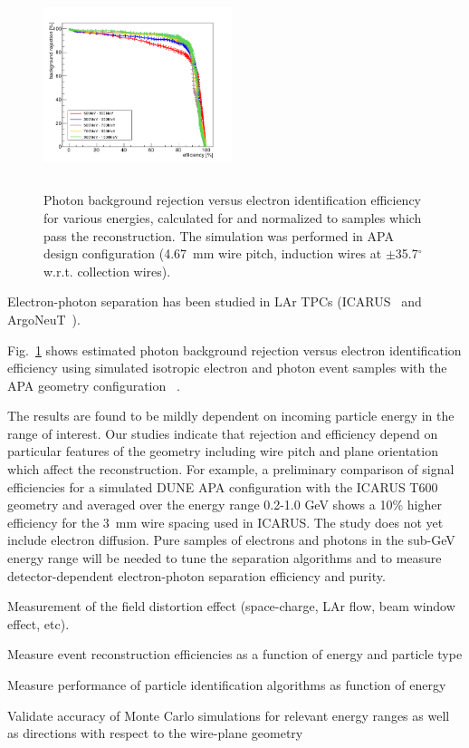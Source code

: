 \begin{description}
\begin{figure}[h!]
  \centering
\includegraphics[width=0.49\textwidth,height=6.0cm]{figures/eff-bgdrej-diffen}
  \caption{
 Photon background rejection versus electron identification efficiency for various energies, calculated for and normalized to samples which pass the reconstruction. 
The simulation was performed in APA design configuration (4.67~mm wire pitch, induction wires at $\pm$35.7$^{\circ}$ w.r.t. collection wires). 
}

\label{fig:egam}
\end{figure}
Electron-photon separation has been studied in LAr TPCs
(ICARUS~\cite{icarus_eg} and ArgoNeuT~\cite{argoneut_eg}).

Fig.~\ref{fig:egam} 
 shows estimated photon background rejection versus electron identification efficiency using 
simulated isotropic electron and photon event samples  with the 
APA geometry configuration ~\cite{dunecdr}.

The results are found to be mildly dependent
on incoming particle energy in the range of interest. 
%
Our studies indicate that rejection and efficiency depend 
on particular features of the geometry including wire pitch and plane 
orientation which affect the reconstruction. 
For example, a preliminary comparison of signal efficiencies for a simulated 
DUNE APA configuration with the ICARUS T600 geometry
and averaged over the energy range 0.2-1.0 GeV shows 
a 10\% higher efficiency for the 3~mm wire spacing used in ICARUS.
The study does not yet include electron diffusion.
%
Pure samples of electrons and photons in the sub-GeV energy range will be
needed to tune the separation algorithms and to measure 
detector-dependent electron-photon separation efficiency and purity.


\item Measurement of the field distortion effect (space-charge, LAr flow, beam window effect, etc).
\item Measure event reconstruction efficiencies as a function of energy and particle type
\item Measure performance of particle identification algorithms as function of energy
\item Validate accuracy of Monte Carlo simulations for relevant energy ranges as well as
directions with respect to the wire-plane geometry
\end{description}


